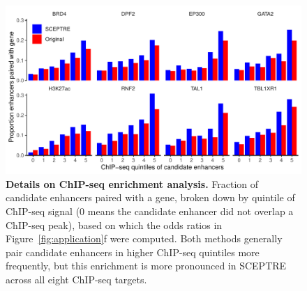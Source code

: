 \documentclass{nature}
\begin{document}



\clearpage
\thispagestyle{empty} 
\begin{figure}[h!]
	\includegraphics[width = \textwidth]{figures/FigureS3/FigureS3.pdf}
	\caption{\textbf{Details on ChIP-seq enrichment analysis.} Fraction of candidate enhancers paired with a gene, broken down by quintile of ChIP-seq signal (0 means the candidate enhancer did not overlap a ChIP-seq peak), based on which the odds ratios in Figure~\ref{fig:application}f were computed. Both methods generally pair candidate enhancers in higher ChIP-seq quintiles more frequently, but this enrichment is more pronounced in SCEPTRE across all eight ChIP-seq targets.}
	\label{fig:chipseq-enrichment-details}
\end{figure}
\end{document}
